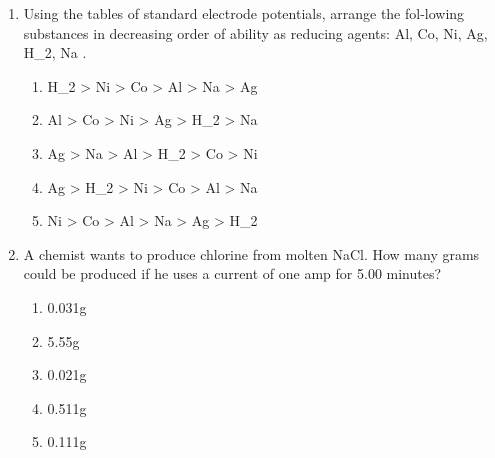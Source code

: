 \documentclass[12pt]{article}
\begin{document}
\begin{enumerate}[label=\arabic*.]
\begin{enumerate}[label=(\alph*)]
    \item 250 liters
    \item 450 liters
    \item 100 liters
    \item 350 liters
    \item 150 liters
\end{enumerate}
\item Using the tables of standard electrode potentials, arrange the fol-lowing substances in
decreasing order of ability as reducing agents: Al, Co, Ni, Ag, H\_2, Na .
\begin{enumerate}[label=(\alph*)]
    \item H\_2 \textgreater{} Ni \textgreater{} Co \textgreater{} Al \textgreater{} Na \textgreater{} Ag
    \item Al \textgreater{} Co \textgreater{} Ni \textgreater{} Ag \textgreater{} H\_2 \textgreater{} Na
    \item Ag \textgreater{} Na \textgreater{} Al \textgreater{} H\_2 \textgreater{} Co \textgreater{} Ni
    \item Ag \textgreater{} H\_2 \textgreater{} Ni \textgreater{} Co \textgreater{} Al \textgreater{} Na
    \item Ni \textgreater{} Co \textgreater{} Al \textgreater{} Na \textgreater{} Ag \textgreater{} H\_2
\end{enumerate}
\item A chemist wants to produce chlorine from molten NaCl. How many grams could be produced if
he uses a current of one amp for 5.00 minutes?
\begin{enumerate}[label=(\alph*)]
    \item 0.031g
    \item 5.55g
    \item 0.021g
    \item 0.511g
    \item 0.111g
\end{enumerate}
\end{enumerate}
\end{document}
